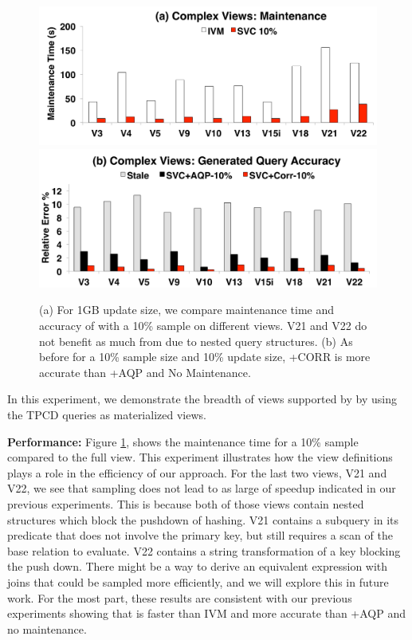\begin{figure}[t]
\centering
 \includegraphics[scale=0.14]{exp/msqv_1.pdf}\vspace{.5em}
 \includegraphics[scale=0.14]{exp/msqv_2.pdf} %
 \caption{(a) For 1GB update size, we compare maintenance time and accuracy of \svc with a 10\% sample on different views. V21 and V22 do not benefit as much from \svc due to nested query structures. (b) As before for a 10\% sample size and 10\% update size, \svcnospace+CORR is more accurate than \svcnospace+AQP and No Maintenance.  \label{exp3-acc}}
\end{figure}
In this experiment, we demonstrate the breadth of views supported by \svc by using the TPCD queries as materialized views.

\textbf{Performance: }
Figure \ref{exp3-acc}, shows the maintenance time for a 10\% sample compared to the full view.
This experiment illustrates how the view definitions plays a role in the efficiency of our approach.
For the last two views, V21 and V22, we see that sampling does not lead to as large of speedup indicated in our previous experiments.  
This is because both of those views contain nested structures which block the pushdown of hashing.
V21 contains a subquery in its predicate that does not involve the primary key, but still requires a scan of the base relation to evaluate.
V22 contains a string transformation of a key blocking the push down.
There might be a way to derive an equivalent expression with joins that could be sampled more efficiently, and we will explore this in future work.
For the most part, these results are consistent with our previous experiments showing that \svc is faster than IVM and more accurate than \svcnospace+AQP and no maintenance.


